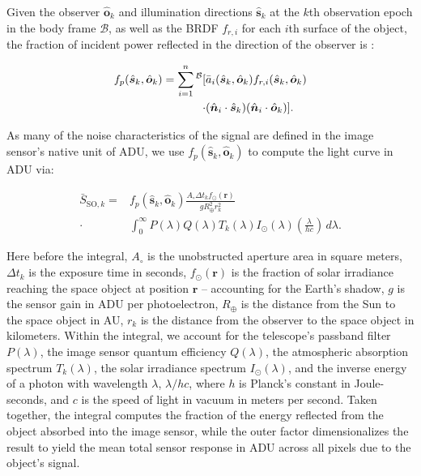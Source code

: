 \documentclass[a4paper,twocolumn]{spaceDebrisC} %
\newcommand{\vctr}[1]{\bm{#1}}
\newcommand{\unitv}[1]{\hat{\vctr{#1}}}
\newcommand{\preup}[1]{\prescript{#1}{}{}}
\newcommand{\rf}[1]{\mathcal{\MakeUppercase{#1}}}
\newcommand{\prf}[1]{\preup{\rf{#1}}}
\begin{document}
Given the observer $\unitv{o}_k$ and illumination directions $\unitv{s}_k$ at the $k$th observation epoch in the body frame $\mathcal{B}$, as well as the BRDF $f_{r,i}$ for each $i$th surface of the object, the fraction of incident power reflected in the direction of the observer is \cite{fan2020thesis}:

\begin{equation} \label{eq:lc_norm}
  \begin{split} 
 f_p(\unitv{s}_k, \unitv{o}_k) = \sum_{i=1}^n\prf{B}[&\bar{a}_i(\unitv{s}_k, \unitv{o}_k) f_{r,i}(\unitv{s}_k, \unitv{o}_k) \\ \cdot &(\unitv{n}_i \cdot \unitv{s}_k) (\unitv{n}_i \cdot \unitv{o}_k)]. 
  \end{split} 
\end{equation}

As many of the noise characteristics of the signal are defined in the image sensor's native unit of ADU, we use $f_p(\unitv{s}_k, \unitv{o}_k)$ to compute the light curve in ADU via:

\begin{equation} \label{eq:general_bright}
  \begin{split} 
 \bar{S}_{\text{SO},k} = &f_p(\unitv{s}_k, \unitv{o}_k) \frac{A_\circ \Delta t_k f_\odot(\vctr{r})}{g R_\oplus^2 r_k^2} \\ \cdot &\int_{0}^{\infty}{P(\lambda)Q(\lambda)T_k(\lambda) I_\odot(\lambda) \left(\frac{\lambda}{hc}\right)}\,d\lambda. 
  \end{split}
\end{equation}

Here before the integral, $A_\circ$ is the unobstructed aperture area in square meters, $\Delta t_k$ is the exposure time in seconds, $f_\odot(\vctr{r})$ is the fraction of solar irradiance reaching the space object at position $\vctr{r}$ -- accounting for the Earth's shadow, $g$ is the sensor gain in ADU per photoelectron, $R_\oplus$ is the distance from the Sun to the space object in AU, $r_k$ is the distance from the observer to the space object in kilometers. Within the integral, we account for the telescope's passband filter $P(\lambda)$, the image sensor quantum efficiency $Q(\lambda)$, the atmospheric absorption spectrum $T_k(\lambda)$, the solar irradiance spectrum $I_\odot(\lambda)$, and the inverse energy of a photon with wavelength $\lambda$, $\lambda / hc$, where $h$ is Planck's constant in Joule-seconds, and $c$ is the speed of light in vacuum in meters per second. Taken together, the integral computes the fraction of the energy reflected from the object absorbed into the image sensor, while the outer factor dimensionalizes the result to yield the mean total sensor response in ADU across all pixels due to the object's signal.
\end{document}

